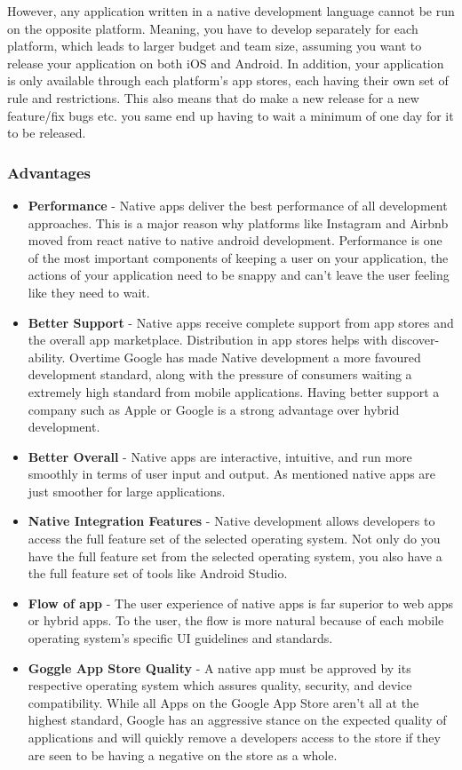 However, any application written in a native development language cannot be run on the opposite platform. Meaning, you have to develop separately for each platform, which leads to larger budget and team size, assuming you want to release your application on both iOS and Android. In addition, your application is only available through each platform's app stores, each having their own set of rule and restrictions. This also means that do make a new release for a new feature/fix bugs etc. you same end up having to wait a minimum of one day for it to be released.

\subsubsection{Advantages}
\begin{itemize}
    \item \textbf{Performance} - Native apps deliver the best performance of all development approaches. This is a major reason why platforms like Instagram and Airbnb \cite{react_native_ex10} \cite{react_native_ex20} moved from react native to native android development. Performance is one of the most important components of keeping a user on your application, the actions of your application need to be snappy and can't leave the user feeling like they need to wait.
    \item \textbf{Better Support} - Native apps receive complete support from app stores and the overall app marketplace. Distribution in app stores helps with discover-ability. Overtime Google has made Native development a more favoured development standard, along with the pressure of consumers waiting a extremely high standard from mobile applications. Having better support a company such as Apple or Google is a strong advantage over hybrid development.
    \item \textbf{Better Overall} - Native apps are interactive, intuitive, and run more smoothly in terms of user input and output. As mentioned native apps are just smoother for large applications.
    \item \textbf{Native Integration Features} - Native development allows developers to access the full feature set of the selected operating system. Not only do you have the full feature set from the selected operating system, you also have a the full feature set of tools like Android Studio.
    \item \textbf{Flow of app} - The user experience of native apps is far superior to web apps or hybrid apps. To the user, the flow is more natural because of each mobile operating system’s specific UI guidelines and standards.
    \item \textbf{Goggle App Store Quality} - A native app must be approved by its respective operating system which assures quality, security, and device compatibility. While all Apps on the Google App Store aren't all at the highest standard, Google has an aggressive stance on the expected quality of applications and will quickly remove a developers access to the store if they are seen to be having a negative on the store as a whole.
\end{itemize}
